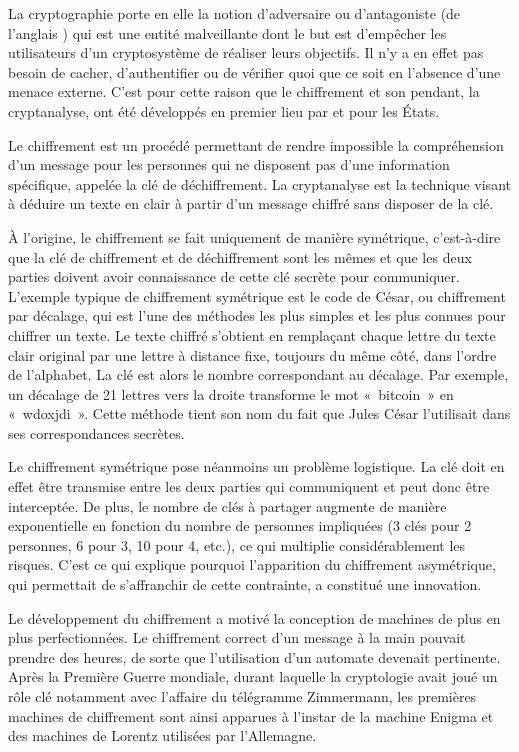 La cryptographie porte en elle la notion d'adversaire ou d'antagoniste (de l'anglais ) qui est une entité malveillante dont le but est d'empêcher les utilisateurs d'un cryptosystème de réaliser leurs objectifs. Il n'y a en effet pas besoin de cacher, d'authentifier ou de vérifier quoi que ce soit en l'absence d'une menace externe. C'est pour cette raison que le chiffrement et son pendant, la cryptanalyse, ont été développés en premier lieu par et pour les États. %

Le chiffrement est un procédé permettant de rendre impossible la compréhension d'un message pour les personnes qui ne disposent pas d'une information spécifique, appelée la clé de déchiffrement. La cryptanalyse est la technique visant à déduire un texte en clair à partir d'un message chiffré sans disposer de la clé.

À l'origine, le chiffrement se fait uniquement de manière symétrique, c'est-à-dire que la clé de chiffrement et de déchiffrement sont les mêmes et que les deux parties doivent avoir connaissance de cette clé secrète pour communiquer. L'exemple typique de chiffrement symétrique est le code de César, ou chiffrement par décalage, qui est l'une des méthodes les plus simples et les plus connues pour chiffrer un texte. Le texte chiffré s'obtient en remplaçant chaque lettre du texte clair original par une lettre à distance fixe, toujours du même côté, dans l'ordre de l'alphabet. La clé est alors le nombre correspondant au décalage. Par exemple, un décalage de 21 lettres vers la droite transforme le mot «~bitcoin~» en «~wdoxjdi~». Cette méthode tient son nom du fait que Jules César l'utilisait dans ses correspondances secrètes.

Le chiffrement symétrique pose néanmoins un problème logistique. La clé doit en effet être transmise entre les deux parties qui communiquent et peut donc être interceptée. De plus, le nombre de clés à partager augmente de manière exponentielle en fonction du nombre de personnes impliquées (3 clés pour 2 personnes, 6 pour 3, 10 pour 4, etc.), ce qui multiplie considérablement les risques. C'est ce qui explique pourquoi l'apparition du chiffrement asymétrique, qui permettait de s'affranchir de cette contrainte, a constitué une innovation.

Le développement du chiffrement a motivé la conception de machines de plus en plus perfectionnées. Le chiffrement correct d'un message à la main pouvait prendre des heures, de sorte que l'utilisation d'un automate devenait pertinente. Après la Première Guerre mondiale, durant laquelle la cryptologie avait joué un rôle clé notamment avec l'affaire du télégramme Zimmermann, les premières machines de chiffrement sont ainsi apparues à l'instar de la machine Enigma et des machines de Lorentz utilisées par l'Allemagne.

